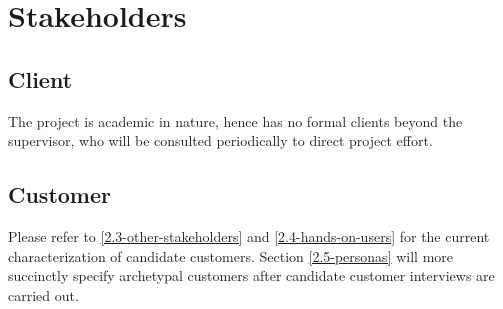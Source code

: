 \documentclass[12pt]{article}
\begin{document}
\section{Stakeholders}
\subsection{Client} \label{2.1-client}
The project is academic in nature, hence has no formal clients beyond the supervisor, who will be consulted periodically to direct project effort.
\subsection{Customer} \label{2.2-customer}
Please refer to \ref{2.3-other-stakeholders} and \ref{2.4-hands-on-users} for the current characterization of candidate customers. Section \ref{2.5-personas} will more succinctly specify archetypal customers after candidate customer interviews are carried out.
\end{document}
